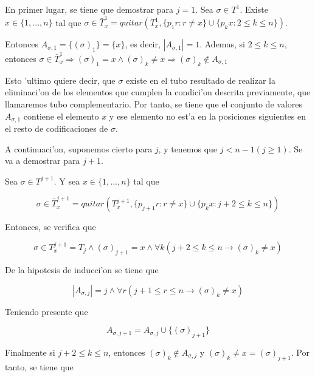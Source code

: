 \documentclass[12pt]{article}
\begin{document}
En primer lugar, se tiene que demostrar para $j = 1$. Sea $\sigma \in T^{1}$. Existe $x \in \{1,...,n\}$ tal que
$\sigma \in \bar{T}_{x}^{1} = quitar(T_{x}^{1}, \{p_{1}r : r \neq x\} \cup \{p_{k}x : 2 \leq k \leq n\})$.

Entonces $A_{\sigma,1} = \{(\sigma)_{1}\} = \{x\}$, es decir, $|A_{\sigma,1}| = 1$. Ademas, si $2 \leq k \leq n$, entonces
$\sigma \in \bar{T}_{x}^{1} \Longrightarrow (\sigma)_{1} = x \land (\sigma)_{k} \neq x \Longrightarrow (\sigma)_{k}
 \notin A_{\sigma,1}$

Esto 'ultimo quiere decir, que $\sigma$ existe en el tubo resultado de realizar la eliminaci'on de los elementos que cumplen
la condici'on descrita previamente, que llamaremos tubo complementario. Por tanto, se tiene que el conjunto de valores $A_{\sigma,1}$
contiene el elemento $x$ y ese elemento no est'a en la posiciones siguientes en el resto de codificaciones de $\sigma$.

A continuaci'on, suponemos cierto para $j$, y tenemos que $j < n - 1 (j \geq 1)$. Se va a demostrar para $j+1$.

Sea $\sigma \in T^{j+1}$. Y sea $x \in \{1,...,n\}$ tal que

\begin{equation*}
    \sigma \in \bar{T}_{x}^{j+1} = quitar(T_{x}^{j+1}, \{p_{j+1}r : r \neq x\} \cup \{p_{k}x : j + 2 \leq k \leq n\})
\end{equation*}

Entonces, se verifica que

\begin{equation*}
    \sigma \in T_{x}^{j+1} = T_{j} \land (\sigma)_{j+1} = x \land \forall k (j + 2 \leq k \leq n \longrightarrow (\sigma)_{k} \neq x)
\end{equation*}

De la hipotesis de inducci'on se tiene que

\begin{equation*}
    |A_{\sigma,j}| = j \land \forall r (j + 1 \leq r \leq n \longrightarrow (\sigma)_{k} \neq x)
\end{equation*}

Teniendo presente que

\begin{equation*}
    A_{\sigma,j+1} = A_{\sigma,j} \cup \{(\sigma)_{j+1}\}
\end{equation*}

Finalmente si $j + 2 \leq k \leq n $, entonces $(\sigma)_{k} \notin A_{\sigma,j}$ y $(\sigma)_{k} \neq x = (\sigma)_{j+1}$.
Por tanto, se tiene que
\end{document}
